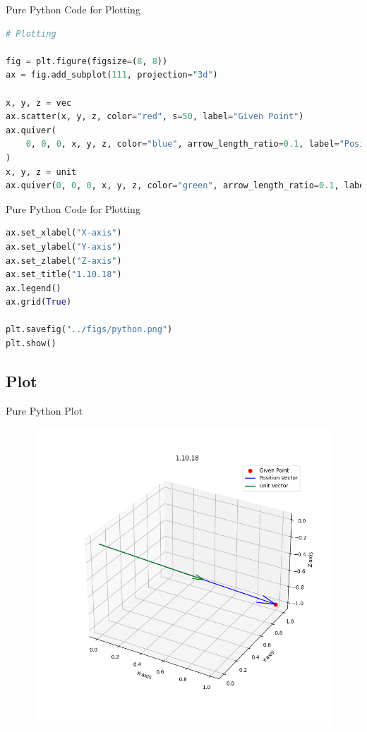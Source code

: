 \documentclass{beamer}
\theoremstyle{remark}
\numberwithin{equation}{section}
\begin{document}
\begin{frame}[fragile]{Pure Python Code for Plotting}
\begin{lstlisting}[language=Python]
# Plotting

fig = plt.figure(figsize=(8, 8))
ax = fig.add_subplot(111, projection="3d")

x, y, z = vec
ax.scatter(x, y, z, color="red", s=50, label="Given Point")
ax.quiver(
    0, 0, 0, x, y, z, color="blue", arrow_length_ratio=0.1, label="Position Vector"
)
x, y, z = unit
ax.quiver(0, 0, 0, x, y, z, color="green", arrow_length_ratio=0.1, label="Unit Vector")
\end{lstlisting}
\end{frame}

\begin{frame}[fragile]{Pure Python Code for Plotting}
\begin{lstlisting}[language=Python]
 ax.set_xlabel("X-axis")
ax.set_ylabel("Y-axis")
ax.set_zlabel("Z-axis")
ax.set_title("1.10.18")
ax.legend()
ax.grid(True)

plt.savefig("../figs/python.png")
plt.show()
\end{lstlisting}
\end{frame}

\subsection{Plot}
\begin{frame}{Pure Python Plot}
 \begin{figure}[H]
    \centering
    \includegraphics[width=0.75\columnwidth]{../figs/python.png}
    \caption*{}
    \label{fig:plot_p}
\end{figure}
\end{frame}
\end{document}
